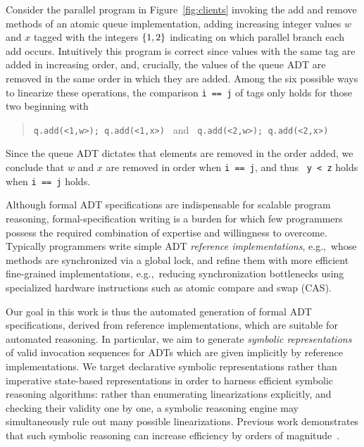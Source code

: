 \begin{example}

  Consider the parallel program in Figure~\ref{fig:clients} invoking the add and
  remove methods of an atomic queue implementation, adding increasing integer
  values $w$ and $x$ tagged with the integers ${\{{1,2}\}}$ indicating on which
  parallel branch each add occurs. Intuitively this program is correct since
  values with the same tag are added in increasing order, and, crucially, the
  values of the queue ADT are removed in the same order in which they are added.
  Among the six possible ways to linearize these operations, the comparison {\tt i ==
  j} of tags only holds for those two beginning with
  \begin{quote}
    \verb|q.add(<1,w>); q.add(<1,x>) | and \verb| q.add(<2,w>); q.add(<2,x>)|
  \end{quote}
  Since the queue ADT dictates that elements are removed in the order added, we
  conclude that $w$ and $x$ are removed in order when {\tt i == j}, and thus {\tt
  y < z} holds when {\tt i == j} holds.

\end{example}

Although formal ADT specifications are indispensable for scalable program
reasoning, formal-specification writing is a burden for which few programmers
possess the required combination of expertise and willingness to overcome.
Typically programmers write simple ADT \emph{reference implementations},
e.g.,~whose methods are synchronized via a global lock, and refine them with
more efficient fine-grained implementations, e.g.,~reducing synchronization
bottlenecks using specialized hardware instructions such as atomic compare and
swap (CAS).

Our goal in this work is thus the automated generation of formal ADT
specifications, derived from reference implementations, which are suitable for
automated reasoning. In particular, we aim to generate \emph{symbolic
representations} of valid invocation sequences for ADTs which are given
implicitly by reference implementations. We target declarative symbolic
representations rather than imperative state-based representations in order to
harness efficient symbolic reasoning algorithms: rather than enumerating
linearizations explicitly, and checking their validity one by one, a symbolic
reasoning engine may simultaneously rule out many possible linearizations.
Previous work demonstrates that such symbolic reasoning can increase
efficiency by orders of magnitude~\cite{conf/pldi/EmmiEH15}.

